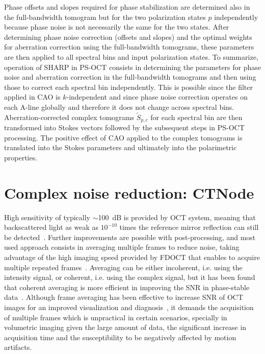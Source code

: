 Phase offsets and slopes required for phase stabilization are determined also in the full-bandwidth tomogram but for the two polarization states $p$ independently because phase noise is not necessarily the same for the two states. After determining phase noise correction (offsets and slopes) and the optimal weights for aberration correction using the full-bandwidth tomograms, these parameters are then applied to all spectral bins and input polarization states. To summarize, operation of SHARP in PS-OCT consists in determining the parameters for phase noise and aberration correction in the full-bandwidth tomograms and then using those to correct each spectral bin independently. This is possible since the filter applied in CAO is $k$-independent and since phase noise correction operates on each A-line globally and therefore it does not change across spectral bins. Aberration-corrected complex tomograms  $\tilde{S}_{p,c}$ for each spectral bin are then transformed into Stokes vectors followed by the subsequent steps in PS-OCT processing. The positive effect of CAO applied to the complex tomograms is translated into the Stokes parameters and ultimately into the polarimetric properties.

\section{Complex noise reduction: CTNode}\label{sec:CTNode}

High sensitivity of typically $\sim$100~dB is provided by OCT system, meaning that backscattered light as weak as $10^{-10}$ times the reference mirror reflection can still be detected~\cite{Choma2003_Sensitivity, deBoer2003_Improved}. Further improvements are possible with post-processing, and most used approach consists in averaging multiple frames to reduce noise, taking advantage of the high imaging speed provided by FDOCT that enables to acquire multiple repeated frames~\cite{Baumann2019_Signal, Szkulmowski2013_Averaging}. Averaging can be either incoherent, i.e. using the intensity signal, or coherent, i.e. using the complex signal, but it has been found that coherent averaging is more efficient in improving the SNR in phase-stable data~\cite{Baumann2019_Signal}. Although frame averaging has been effective to increase SNR of OCT images for an improved visualization and diagnosis~\cite{Sakamoto2008_SpectralDomain}, it demands the acquisition of multiple frames which is unpractical in certain scenarios, specially in volumetric imaging given the large amount of data, the significant increase in acquisition time and the susceptibility to be negatively affected by motion artifacts. 

